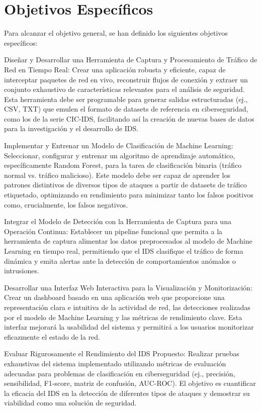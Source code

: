 \section{Objetivos Específicos}
Para alcanzar el objetivo general, se han definido los siguientes objetivos específicos:

Diseñar y Desarrollar una Herramienta de Captura y Procesamiento de Tráfico de Red en Tiempo Real: Crear una aplicación robusta y eficiente, capaz de interceptar paquetes de red en vivo, reconstruir flujos de conexión y extraer un conjunto exhaustivo de características relevantes para el análisis de seguridad. Esta herramienta debe ser programable para generar salidas estructuradas (ej., CSV, TXT) que emulen el formato de datasets de referencia en ciberseguridad, como los de la serie CIC-IDS, facilitando así la creación de nuevas bases de datos para la investigación y el desarrollo de IDS.

Implementar y Entrenar un Modelo de Clasificación de Machine Learning: Seleccionar, configurar y entrenar un algoritmo de aprendizaje automático, específicamente Random Forest, para la tarea de clasificación binaria (tráfico normal vs. tráfico malicioso). Este modelo debe ser capaz de aprender los patrones distintivos de diversos tipos de ataques a partir de datasets de tráfico etiquetado, optimizando su rendimiento para minimizar tanto los falsos positivos como, crucialmente, los falsos negativos.

Integrar el Modelo de Detección con la Herramienta de Captura para una Operación Continua: Establecer un pipeline funcional que permita a la herramienta de captura alimentar los datos preprocesados al modelo de Machine Learning en tiempo real, permitiendo que el IDS clasifique el tráfico de forma dinámica y emita alertas ante la detección de comportamientos anómalos o intrusiones.

Desarrollar una Interfaz Web Interactiva para la Visualización y Monitorización: Crear un dashboard basado en una aplicación web que proporcione una representación clara e intuitiva de la actividad de red, las detecciones realizadas por el modelo de Machine Learning y las métricas de rendimiento clave. Esta interfaz mejorará la usabilidad del sistema y permitirá a los usuarios monitorizar eficazmente el estado de la red.

Evaluar Rigurosamente el Rendimiento del IDS Propuesto: Realizar pruebas exhaustivas del sistema implementado utilizando métricas de evaluación adecuadas para problemas de clasificación en ciberseguridad (ej., precisión, sensibilidad, F1-score, matriz de confusión, AUC-ROC). El objetivo es cuantificar la eficacia del IDS en la detección de diferentes tipos de ataques y demostrar su viabilidad como una solución de seguridad.
